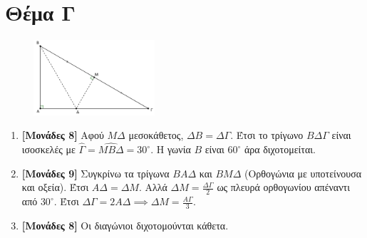 \documentclass[12pt]{article}
\begin{document}
\section*{Θέμα Γ}
  \noindent
  \begin{figure}
    \centering
    \vspace{-20pt}
    \includegraphics[width=0.4\textwidth]{2017AGeo3}
  \end{figure}
    \begin{enumerate}
    \item \textbf{[Μονάδες 8]} Αφού $ΜΔ$ μεσοκάθετος, $ΔΒ=ΔΓ$. Έτσι το τρίγωνο $ΒΔΓ$ είναι ισοσκελές με $\hat{Γ}=\widehat{ΜΒΔ}=30^{\circ}$. Η γωνία $Β$ είναι $60^{\circ}$ άρα διχοτομείται.
    \item \textbf{[Μονάδες 9]} Συγκρίνω τα τρίγωνα $ΒΑΔ$ και $ΒΜΔ$ (Ορθογώνια με υποτείνουσα και οξεία). Έτσι $ΑΔ=ΔΜ$. Αλλά $ΔΜ=\frac{ΔΓ}{2}$ ως πλευρά ορθογωνίου απέναντι από $30^{\circ}$. Έτσι $ΔΓ=2ΑΔ \implies ΔΜ=\frac{ΑΓ}{3}$.
    \item \textbf{[Μονάδες 8]} Οι διαγώνιοι διχοτομούνται κάθετα.
  \end{enumerate}
\end{document}
